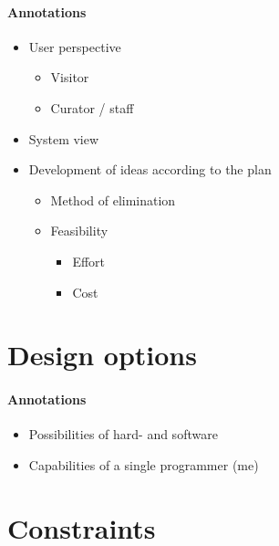 \paragraph{Annotations}

\begin{itemize}
	\item User perspective
	\begin{itemize}
		\item Visitor
		\item Curator / staff
	\end{itemize}
	\item System view
	\\
	\item Development of ideas according to the plan
	\begin{itemize}
		\item Method of elimination
		\item Feasibility
		\begin{itemize}
			\item Effort
			\item Cost
		\end{itemize}
	\end{itemize}
\end{itemize}


\section{Design options}
\label{conception_design}

\paragraph{Annotations}

\begin{itemize}
	\item Possibilities of hard- and software
	\item Capabilities of a single programmer (me)
\end{itemize}


\section{Constraints}
\label{conception_constraints}

